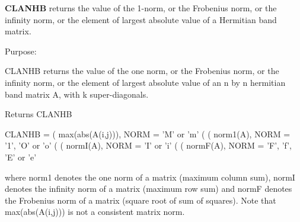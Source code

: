 {\bfseries C\+L\+A\+N\+H\+B} returns the value of the 1-\/norm, or the Frobenius norm, or the infinity norm, or the element of largest absolute value of a Hermitian band matrix. 

 \begin{DoxyParagraph}{Purpose\+: }
\begin{DoxyVerb} CLANHB  returns the value of the one norm,  or the Frobenius norm, or
 the  infinity norm,  or the element of  largest absolute value  of an
 n by n hermitian band matrix A,  with k super-diagonals.\end{DoxyVerb}

\end{DoxyParagraph}
\begin{DoxyReturn}{Returns}
C\+L\+A\+N\+H\+B \begin{DoxyVerb}    CLANHB = ( max(abs(A(i,j))), NORM = 'M' or 'm'
             (
             ( norm1(A),         NORM = '1', 'O' or 'o'
             (
             ( normI(A),         NORM = 'I' or 'i'
             (
             ( normF(A),         NORM = 'F', 'f', 'E' or 'e'

 where  norm1  denotes the  one norm of a matrix (maximum column sum),
 normI  denotes the  infinity norm  of a matrix  (maximum row sum) and
 normF  denotes the  Frobenius norm of a matrix (square root of sum of
 squares).  Note that  max(abs(A(i,j)))  is not a consistent matrix norm.\end{DoxyVerb}
 
\end{DoxyReturn}

